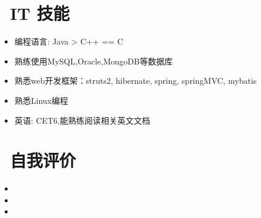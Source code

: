 \documentclass{resume}
\begin{document}
\section{\faCogs\ IT 技能}
\begin{itemize}[parsep=0.5ex]
  \item 编程语言: Java >  C++ == C 
  \item 熟练使用MySQL,Oracle,MongoDB等数据库
  \item 熟悉web开发框架：struts2, hibernate, spring, springMVC, mybatis
  \item 熟悉Linux编程
  \item 英语: CET6,能熟练阅读相关英文文档
\end{itemize}

\section{\faInfo\ 自我评价}
\begin{itemize}[parsep=0.5ex]
  \item 
  \item 
  \item 
\end{itemize}

%
%
\end{document}
